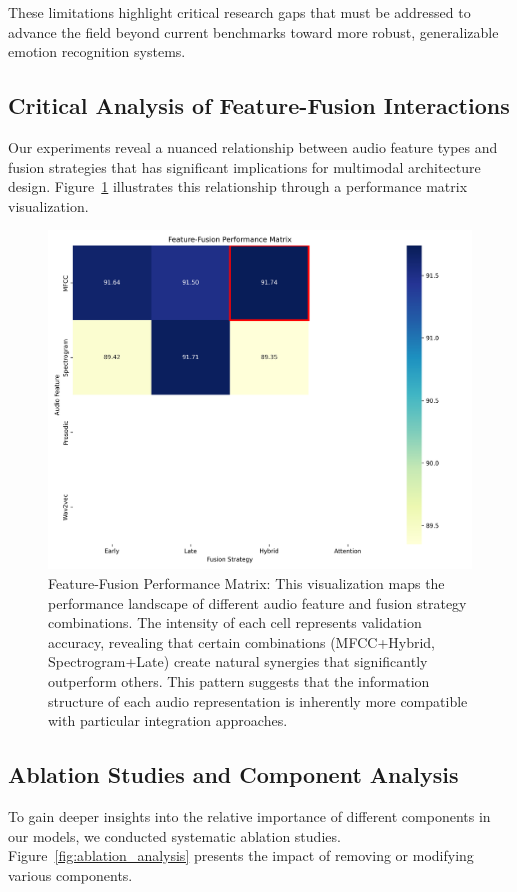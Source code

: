 \documentclass[12pt]{article}
\begin{document}
These limitations highlight critical research gaps that must be addressed to advance the field beyond current benchmarks toward more robust, generalizable emotion recognition systems.

\subsection{Critical Analysis of Feature-Fusion Interactions}
Our experiments reveal a nuanced relationship between audio feature types and fusion strategies that has significant implications for multimodal architecture design. Figure~\ref{fig:feature_fusion_matrix} illustrates this relationship through a performance matrix visualization.

\begin{figure}[h]
    \centering
    \includegraphics[width=0.9\linewidth]{Figures/feature_fusion_matrix.png}
    \caption{Feature-Fusion Performance Matrix: This visualization maps the performance landscape of different audio feature and fusion strategy combinations. The intensity of each cell represents validation accuracy, revealing that certain combinations (MFCC+Hybrid, Spectrogram+Late) create natural synergies that significantly outperform others. This pattern suggests that the information structure of each audio representation is inherently more compatible with particular integration approaches.}
    \label{fig:feature_fusion_matrix}
\end{figure}

\subsection{Ablation Studies and Component Analysis}
To gain deeper insights into the relative importance of different components in our models, we conducted systematic ablation studies. Figure~\ref{fig:ablation_analysis} presents the impact of removing or modifying various components.
\end{document}

